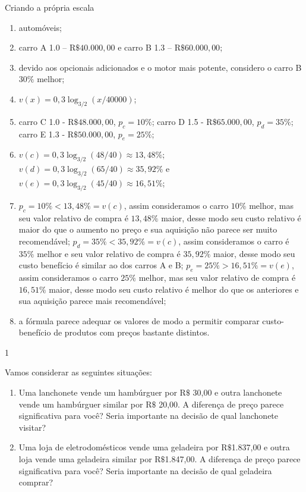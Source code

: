 \begin{answer}{Criando a própria escala}
{
	\begin{enumerate}
	\item automóveis;
	\item carro A 1.0 – R$\$ 40.000{,}00$ e carro B 1.3 – R$\$60.000{,}00$;
	\item devido aos opcionais adicionados e o motor mais potente, considero o carro B 30$\%$ melhor;
	\item $v(x) = 0{,}3\log_{3/2}\left(x/40000\right)$;
	\item carro C 1.0 - R$\$ 48.000{,}00$, $p_c=10\%$; carro D 1.5 - R$\$ 65.000{,}00$, $p_d=35\%$; carro E 1.3 - R$\$ 50.000{,}00$, $p_e=25\%$;
	\item $v(c) = 0{,}3\log_{3/2}\left(48/40\right) \approx 13{,}48\%$; $v(d) = 0{,}3\log_{3/2}\left(65/40\right) \approx 35{,}92\%$ e $v(e) = 0{,}3\log_{3/2}\left(45/40\right) \approx 16{,}51\%$;
	\item $p_c = 10\% < 13{,}48\% = v(c)$, assim consideramos o carro $10\%$ melhor, mas seu valor relativo de compra é $13{,}48\%$ maior, desse modo seu custo relativo é maior do que o aumento no preço e sua aquisição não parece ser muito recomendável; $p_d = 35\% < 35{,}92\% = v(c)$, assim consideramos o carro é $35\%$ melhor e seu valor relativo de compra é $35{,}92\%$ maior, desse modo seu custo benefício é similar ao dos carros A e B; $p_e = 25\% > 16{,}51\% = v(e)$, assim consideramos o carro $25\%$ melhor, mas seu valor relativo de compra é $16{,}51\%$ maior, desse modo seu custo relativo é melhor do que os anteriores e sua aquisição parece mais recomendável;
	\item a fórmula parece adequar os valores de modo a permitir comparar custo-benefício de produtos com preços bastante distintos. 
	\end{enumerate}
}{1}
\end{answer}



Vamos considerar as seguintes situações:
\begin{enumerate}
\item Uma lanchonete vende um hambúrguer por R$\$$ 30,00 e outra lanchonete vende um hambúrguer similar por R$\$$ 20,00. A diferença de preço parece significativa para você? Seria importante na decisão de qual lanchonete visitar?
\item Uma loja de eletrodomésticos vende uma geladeira por R$\$$1.837,00 e outra loja vende uma geladeira similar por R$\$$1.847,00. A diferença de preço parece significativa para você? Seria importante na decisão de qual geladeira comprar?
\end{enumerate}

